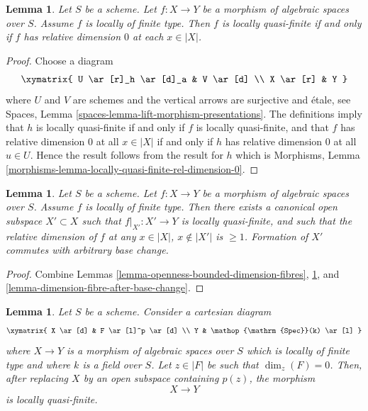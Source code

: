 \documentclass{stacks-project}
\theoremstyle{plain}
\newtheorem{lemma}[subsection]{Lemma}
\theoremstyle{definition}
\theoremstyle{remark}
\numberwithin{equation}{subsection}
\def\Spec{\mathop{\mathrm{Spec}}}
\begin{document}
\begin{lemma}
\label{lemma-locally-quasi-finite-rel-dimension-0}
Let $S$ be a scheme.
Let $f : X \to Y$ be a morphism of algebraic spaces over $S$.
Assume $f$ is locally of finite type.
Then $f$ is locally quasi-finite if and only if $f$ has relative
dimension $0$ at each $x \in |X|$.
\end{lemma}

\begin{proof}
Choose a diagram
$$
\xymatrix{
U \ar[r]_h \ar[d]_a & V \ar[d] \\
X \ar[r] & Y
}
$$
where $U$ and $V$ are schemes and the vertical arrows are surjective and
\'etale, see
Spaces, Lemma \ref{spaces-lemma-lift-morphism-presentations}.
The definitions imply that
$h$ is locally quasi-finite if and only if $f$ is locally quasi-finite,
and that $f$ has relative dimension $0$ at all $x \in |X|$ if and
only if $h$ has relative dimension $0$ at all $u \in U$.
Hence the result follows from the result for $h$ which is
Morphisms, Lemma \ref{morphisms-lemma-locally-quasi-finite-rel-dimension-0}.
\end{proof}

\begin{lemma}
\label{lemma-locally-finite-type-quasi-finite-part}
Let $S$ be a scheme.
Let $f : X \to Y$ be a morphism of algebraic spaces over $S$.
Assume $f$ is locally of finite type.
Then there exists a canonical open subspace $X' \subset X$ such that
$f|_{X'} : X' \to Y$ is locally quasi-finite, and such that the
relative dimension of $f$ at any $x \in |X|$, $x \not \in |X'|$ is
$\geq 1$. Formation of $X'$ commutes with arbitrary base change.
\end{lemma}

\begin{proof}
Combine
Lemmas \ref{lemma-openness-bounded-dimension-fibres},
\ref{lemma-locally-quasi-finite-rel-dimension-0}, and
\ref{lemma-dimension-fibre-after-base-change}.
\end{proof}

\begin{lemma}
\label{lemma-quasi-finite-at-point}
Let $S$ be a scheme. Consider a cartesian diagram
$$
\xymatrix{
X \ar[d] & F \ar[l]^p \ar[d] \\
Y & \Spec(k) \ar[l]
}
$$
where $X \to Y$ is a morphism of algebraic spaces over $S$ which is
locally of finite type and where $k$ is a field over $S$.
Let $z \in |F|$ be such that $\dim_z(F) = 0$. Then, after replacing $X$
by an open subspace containing $p(z)$, the morphism
$$
X \longrightarrow Y
$$
is locally quasi-finite.
\end{lemma}
\end{document}
